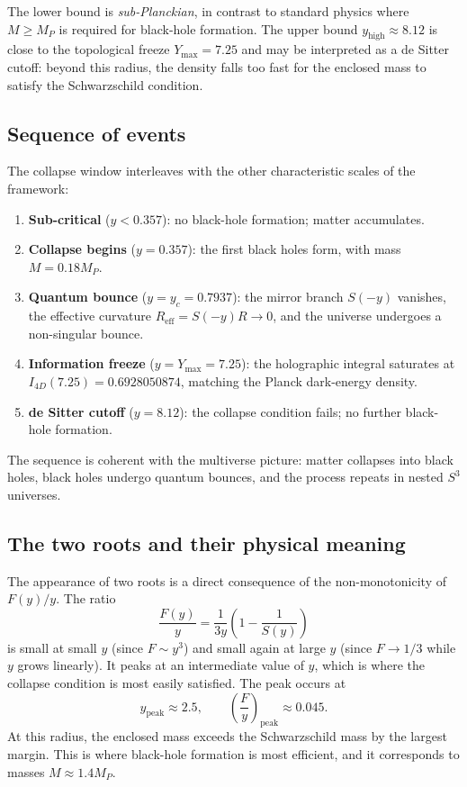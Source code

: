 \documentclass[a4paper,7pt,oneside,openany]{book}
\begin{document}
The lower bound is \emph{sub-Planckian}, in contrast to 
standard physics where $M\ge M_{P}$ is required for black-hole 
formation. The upper bound $y_{\text{high}}\approx 8.12$ is 
close to the topological freeze $Y_{\max}=7.25$ and may be 
interpreted as a de Sitter cutoff: beyond this radius, the 
density falls too fast for the enclosed mass to satisfy the 
Schwarzschild condition.

\subsection{Sequence of events}

The collapse window interleaves with the other characteristic 
scales of the framework:
\begin{enumerate}
\item \textbf{Sub-critical} ($y<0.357$): no black-hole 
formation; matter accumulates.
\item \textbf{Collapse begins} ($y=0.357$): the first black 
holes form, with mass $M=0.18 M_{P}$.
\item \textbf{Quantum bounce} ($y=y_{c}=0.7937$): the mirror 
branch $S(-y)$ vanishes, the effective curvature 
$R_{\text{eff}}=S(-y)R\to 0$, and the universe undergoes a 
non-singular bounce.
\item \textbf{Information freeze} ($y=Y_{\max}=7.25$): the 
holographic integral saturates at 
$I_{4D}(7.25)=0.6928050874$, matching the Planck dark-energy 
density.
\item \textbf{de Sitter cutoff} ($y=8.12$): the collapse 
condition fails; no further black-hole formation.
\end{enumerate}
The sequence is coherent with the multiverse picture: matter 
collapses into black holes, black holes undergo quantum 
bounces, and the process repeats in nested $S^{3}$ universes.

\subsection{The two roots and their physical meaning}

The appearance of two roots is a direct consequence of the 
non-monotonicity of $F(y)/y$. The ratio
\begin{equation}
\frac{F(y)}{y}
=
\frac{1}{3y}\left(1-\frac{1}{S(y)}\right)
\label{eq:F-over-y}
\end{equation}
is small at small $y$ (since $F\sim y^{3}$) and small again at 
large $y$ (since $F\to 1/3$ while $y$ grows linearly). It peaks 
at an intermediate value of $y$, which is where the collapse 
condition is most easily satisfied. The peak occurs at
\begin{equation}
y_{\text{peak}}\approx 2.5,
\qquad
\left(\frac{F}{y}\right)_{\text{peak}}\approx 0.045.
\label{eq:peak}
\end{equation}
At this radius, the enclosed mass exceeds the Schwarzschild 
mass by the largest margin. This is where black-hole formation 
is most efficient, and it corresponds to masses 
$M\approx 1.4 M_{P}$.
\end{document}
